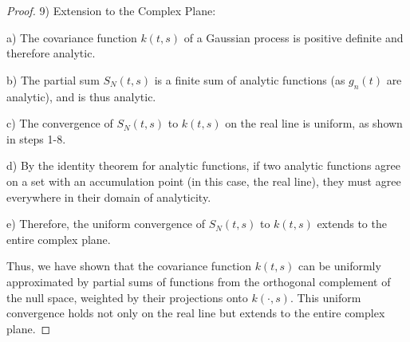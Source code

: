 \begin{proof}


9) Extension to the Complex Plane:
   
   a) The covariance function $k(t,s)$ of a Gaussian process is positive definite and therefore analytic.
   
   b) The partial sum $S_N(t,s)$ is a finite sum of analytic functions (as $g_n(t)$ are analytic), and is thus analytic.
   
   c) The convergence of $S_N(t,s)$ to $k(t,s)$ on the real line is uniform, as shown in steps 1-8.
   
   d) By the identity theorem for analytic functions, if two analytic functions agree on a set with an accumulation point (in this case, the real line), they must agree everywhere in their domain of analyticity.
   
   e) Therefore, the uniform convergence of $S_N(t,s)$ to $k(t,s)$ extends to the entire complex plane.

Thus, we have shown that the covariance function $k(t,s)$ can be uniformly approximated by partial sums of functions from the orthogonal complement of the null space, weighted by their projections onto $k(\cdot,s)$. This uniform convergence holds not only on the real line but extends to the entire complex plane.
\end{proof}

